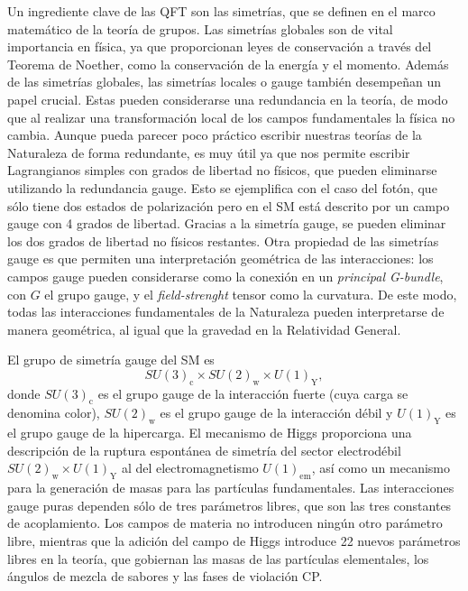 Un ingrediente clave de las QFT son las simetrías, que se definen en el marco matemático de la teoría de grupos. Las simetrías globales son de vital importancia en física, ya que proporcionan leyes de conservación a través del Teorema de Noether, como la conservación de la energía y el momento. Además de las simetrías globales, las simetrías locales o gauge también desempeñan un papel crucial. Estas pueden considerarse una redundancia en la teoría, de modo que al realizar una transformación local de los campos fundamentales la física no cambia. Aunque pueda parecer poco práctico escribir nuestras teorías de la Naturaleza de forma redundante, es muy útil ya que nos permite escribir Lagrangianos simples con grados de libertad no físicos, que pueden eliminarse utilizando la redundancia gauge. Esto se ejemplifica con el caso del fotón, que sólo tiene dos estados de polarización pero en el SM está descrito por un campo gauge con 4 grados de libertad. Gracias a la simetría gauge, se pueden eliminar los dos grados de libertad no físicos restantes. Otra propiedad de las simetrías gauge es que permiten una interpretación geométrica de las interacciones: los campos gauge pueden considerarse como la conexión en un \textit{principal G-bundle}, con $G$ el grupo gauge, y el \textit{field-strenght} tensor como la curvatura. De este modo, todas las interacciones fundamentales de la Naturaleza pueden interpretarse de manera geométrica, al igual que la gravedad en la Relatividad General.

El grupo de simetría gauge del SM es
\begin{equation*}
SU(3)_{\textrm{c}}\times SU(2)_{\textrm{w}}\times U(1)_{\textrm{Y}},
\end{equation*}
donde $SU(3)_{\textrm{c}}$ es el grupo gauge de la interacción fuerte (cuya carga se denomina color), $SU(2)_{\textrm{w}}$ es el grupo gauge de la interacción débil y $U(1)_{\textrm{Y}}$ es el grupo gauge de la hipercarga. El mecanismo de Higgs proporciona una descripción de la ruptura espontánea de simetría del sector electrodébil $SU(2)_{\textrm{w}}\times U(1)_{\textrm{Y}}$ al del electromagnetismo $U(1)_{\textrm{em}}$, así como un mecanismo para la generación de masas para las partículas fundamentales. Las interacciones gauge puras dependen sólo de tres parámetros libres, que son las tres constantes de acoplamiento. Los campos de materia no introducen ningún otro parámetro libre, mientras que la adición del campo de Higgs introduce 22 nuevos parámetros libres en la teoría, que gobiernan las masas de las partículas elementales, los ángulos de mezcla de sabores y las fases de violación CP.

